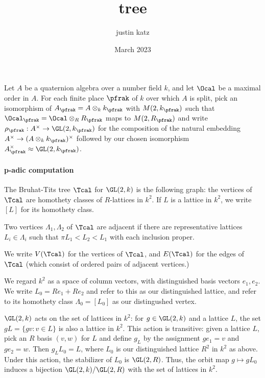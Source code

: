 \documentclass{article}
\title{tree}
\author{justin katz}
\date{March 2023}
\begin{document}
Let $A$ be a quaternion algebra over a number field $k$, and let $\Ocal$ be a maximal order in $A$. For each finite place $\pfrak$ of $k$ over which $A$ is split, pick an isomorphism of $A_\pfrak =A\otimes_k k_\pfrak$ with $M(2,k_\pfrak)$ such that $\Ocal_\pfrak = \Ocal \otimes_R R_\pfrak$ maps to $M(2,R_\pfrak)$ and write $\rho_\pfrak:A^\times \to \GL(2,k_\pfrak)$ for the composition of the natural embedding $A^\times \to (A\otimes_k k_\pfrak)^\times$ followed by our chosen isomorphism $A_\pfrak^\times \approx \GL(2,k_\pfrak)$. 

\paragraph*{p-adic computation}
\begin{definition}
The Bruhat-Tits tree $\Tcal$ for $\GL(2,k)$ is the following graph: the vertices of $\Tcal$ are homothety classes of $R$-lattices in $k^2$.
If $L$ is a lattice in $k^2$, we write $[L]$ for its homothety class. 

Two vertices $\Lambda_1,\Lambda_2 $ of $\Tcal$ are adjacent if there are representative lattices $L_i \in \Lambda_i$ such that $\pi L_1 < L_2 < L_1$ with each inclusion proper.

We write $V(\Tcal)$ for the vertices of $\Tcal$, and $E(\Tcal)$ for the edges of $\Tcal$ (which consist of ordered pairs of adjacent vertices.)
\end{definition}

We regard $k^2$ as a space of column vectors, with distinguished basis vectors $e_1,e_2$. We write $L_0 = Re_1+Re_2$ and refer to this as our distinguished lattice, and refer to its homothety class $\Lambda_0 = [L_0]$ as our distingushed vertex.  
 
$\GL(2,k)$ acts on the set of lattices in $k^2$: for $g\in \GL(2,k)$ and a lattice $L$, the set $gL = \{ g v : v \in L\}$ is also a lattice in $k^2$. This action is transitive: given a lattice $L$, pick an $R$ basis $(v,w)$ for $L$ and define $g_L$ by the assignment $ge_1 = v$ and $ge_2 = w$. Then $g_L L_0 =L$, where $L_0$ is our distinguished lattice $R^2$ in $k^2$ as above. Under this action, the stabilizer of $L_0$ is $\GL(2,R)$. Thus, the orbit map $g \mapsto gL_0$ induces a bijection $\GL(2,k)/ \GL(2,R)$ with the set of lattices in $k^2$. 
 
\end{document}

